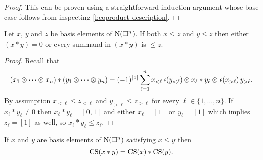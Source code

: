 \begin{proof}
	This can be proven using a straightforward induction argument whose base case follows from inspecting \cref{l:coproduct description}.
\end{proof}

\begin{lemma}
	Let $x$, $y$ and $z$ be basis elements of $\operatorname{N}(\square^n)$.
	If both $x \leq z$ and $y \leq z$ then either $(x \ast y) = 0$ or every summand in $(x \ast y)$ is $\leq z$.
\end{lemma}

\begin{proof}
	Recall that
	\begin{multline*}
		(x_1 \otimes \cdots \otimes x_n) \ast (y_1 \otimes \cdots \otimes y_n)
		=
		(-1)^{|x|} \sum_{\ell=1}^n x_{<\ell}\, \epsilon(y_{<\ell}) \otimes x_\ell \ast y_\ell \otimes \epsilon(x_{>\ell}) \, y_{>\ell}.
	\end{multline*}
	By assumption $x_{<\ell} \leq z_{<\ell}$ and $y_{>\ell} \leq z_{>\ell}$ for every $\ell \in \{1, \dots, n\}$.
	If $x_\ell \ast y_\ell \neq 0$ then $x_\ell \ast y_\ell = [0,1]$ and either $x_\ell = [1]$ or $y_\ell = [1]$ which implies $z_\ell = [1]$ as well, so $x_\ell \ast y_\ell \leq z_\ell$.
\end{proof}

\begin{lemma}
	If $x$ and $y$ are basis elements of $\operatorname{N}(\square^n)$ satisfying $x \leq y$ then
	\begin{equation} \label{e:cs collapse as algebra map}
		\operatorname{CS}(x \ast y) = \operatorname{CS}(x) \ast \operatorname{CS}(y).
	\end{equation}
\end{lemma}

